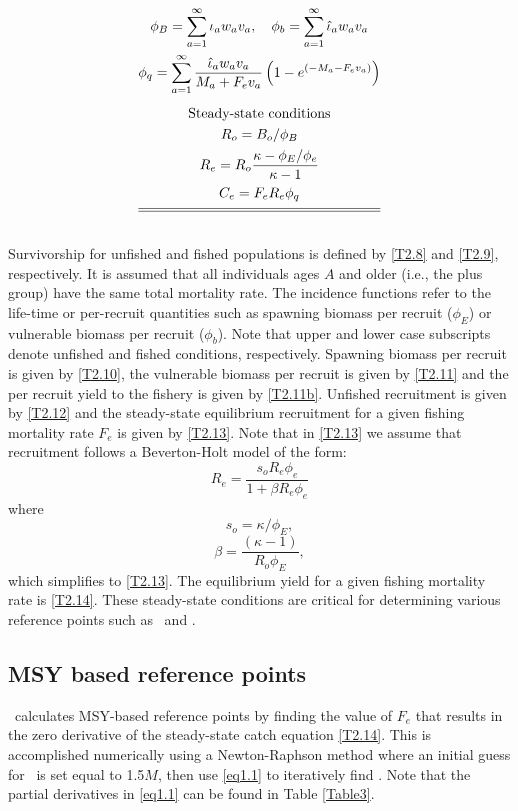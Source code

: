 \begin{table}[!tbp]
\begin{gather}
            \phi_B=\sum_{a=1}^\infty \iota_a w_a v_a, \quad
            \phi_b=\sum_{a=1}^\infty \hat{\iota}_a w_a v_a \label{T2.11}\\
            \phi_q=\sum_{a=1}^\infty
                \frac{ \hat{\iota}_a w_a v_a}{M_a+F_ev_a}
                \left(1-e^{(-M_a-F_ev_a)}\right) \label{T2.11b} \\[1ex]
        \mbox{Steady-state conditions} \nonumber \\
        R_o=B_o/ \phi_B \label{T2.12}\\
        R_e=R_o\frac{\kappa-\phi_E/\phi_e}{\kappa-1} \label{T2.13}\\
        C_e=F_e R_e \phi_q\label{T2.14} \\[1ex]
        \hline \hline \nonumber
    \end{gather}
    \normalEq
\end{table}
Survivorship for unfished and fished populations is defined by \eqref{T2.8} and \eqref{T2.9}, respectively.  It is assumed that all individuals ages $A$ and older (i.e., the plus group) have the same total mortality rate.  The incidence functions refer to the life-time or per-recruit quantities such as spawning biomass per recruit ($\phi_E$) or vulnerable biomass per recruit ($\phi_b$).  Note that upper and lower case subscripts denote unfished and fished conditions, respectively.  Spawning biomass per recruit is given by \eqref{T2.10}, the vulnerable biomass per recruit is given by \eqref{T2.11} and the per recruit yield to the fishery is given by \eqref{T2.11b}.  Unfished recruitment is given by \eqref{T2.12} and the steady-state equilibrium recruitment  for a given fishing mortality rate $F_e$ is given by \eqref{T2.13}.  Note that in \eqref{T2.13} we assume that recruitment follows a Beverton-Holt model of the form:
\[
R_e=\frac{s_o R_e \phi_e}{1+\beta R_e \phi_e}
\]
where
\[
s_o = \kappa/\phi_E,
\]
\[
\beta = \frac{(\kappa-1)}{R_o\phi_E},
\]
which simplifies to \eqref{T2.13}.
The equilibrium yield for a given fishing mortality rate is \eqref{T2.14}.  These steady-state conditions are critical for determining various reference points such as \fmsy\ and \bmsy. 
	
\subsection{MSY based reference points}
\iscam\ calculates MSY-based reference points by finding the value of $F_e$ that results in the zero derivative of the steady-state catch equation \eqref{T2.14}.  This is accomplished numerically using a Newton-Raphson method where an initial guess for \fmsy\ is set equal to 1.5$M$, then use \eqref{eq1.1} to iteratively find \fmsy.  Note that the partial derivatives in \eqref{eq1.1} can be found in Table \ref{Table3}.

